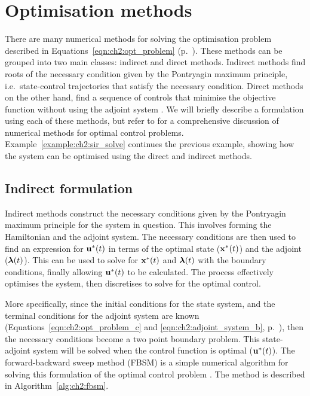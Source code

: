 \section{Optimisation methods}\label{sec:ch2:optim_methods}

There are many numerical methods for solving the optimisation problem described in Equations~\ref{eqn:ch2:opt_problem} (p.~\pageref{eqn:ch2:opt_problem}). These methods can be grouped into two main classes: indirect and direct methods. Indirect methods find roots of the necessary condition given by the Pontryagin maximum principle, i.e.\ state-control trajectories that satisfy the necessary condition. Direct methods on the other hand, find a sequence of controls that minimise the objective function without using the adjoint system \citep{betts_practical_2010}. We will briefly describe a formulation using each of these methods, but refer to \citet{betts_practical_2010} for a comprehensive discussion of numerical methods for optimal control problems. Example~\ref{example:ch2:sir_solve} continues the previous example, showing how the system can be optimised using the direct and indirect methods.

\subsection{Indirect formulation}

Indirect methods construct the necessary conditions given by the Pontryagin maximum principle for the system in question. This involves forming the Hamiltonian and the adjoint system. The necessary conditions are then used to find an expression for $\mathbf{\bm{u}}^*(t)$ in terms of the optimal state ($\mathbf{\bm{x}}^*(t)$) and the adjoint ($\mathbf{\bm{\lambda}}(t)$). This can be used to solve for $\mathbf{\bm{x}}^*(t)$ and $\mathbf{\bm{\lambda}}(t)$ with the boundary conditions, finally allowing $\mathbf{\bm{u}}^*(t)$ to be calculated. The process effectively optimises the system, then discretises to solve for the optimal control.

More specifically, since the initial conditions for the state system, and the terminal conditions for the adjoint system are known (Equations~\ref{eqn:ch2:opt_problem_c} and \ref{eqn:ch2:adjoint_system_b}, p.~\pageref{eqn:ch2:opt_problem_c}), then the necessary conditions become a two point boundary problem. This state-adjoint system will be solved when the control function is optimal ($\mathbf{\bm{u}}^*(t)$). The forward-backward sweep method (FBSM) is a simple numerical algorithm for solving this formulation of the optimal control problem \citep{lenhart_optimal_2007}. The method is described in Algorithm~\ref{alg:ch2:fbsm}.


